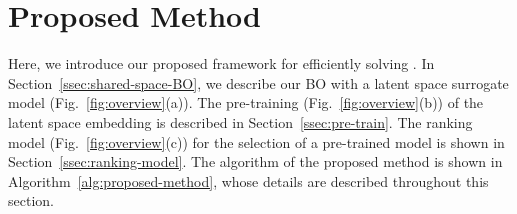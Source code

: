 \section{Proposed Method}
\label{sec:Proposed}


Here, we introduce our proposed framework for efficiently solving .
%
In Section~\ref{ssec:shared-space-BO}, we describe our BO with a latent space surrogate model (Fig.~\ref{fig:overview}(a)). 
%
The pre-training (Fig.~\ref{fig:overview}(b)) of the latent space embedding is described in Section~\ref{ssec:pre-train}.
%
The ranking model (Fig.~\ref{fig:overview}(c)) for the selection of a pre-trained model is shown in Section~\ref{ssec:ranking-model}. 
%
The algorithm of the proposed method is shown in Algorithm~\ref{alg:proposed-method}, whose details are described throughout this section. 


%


